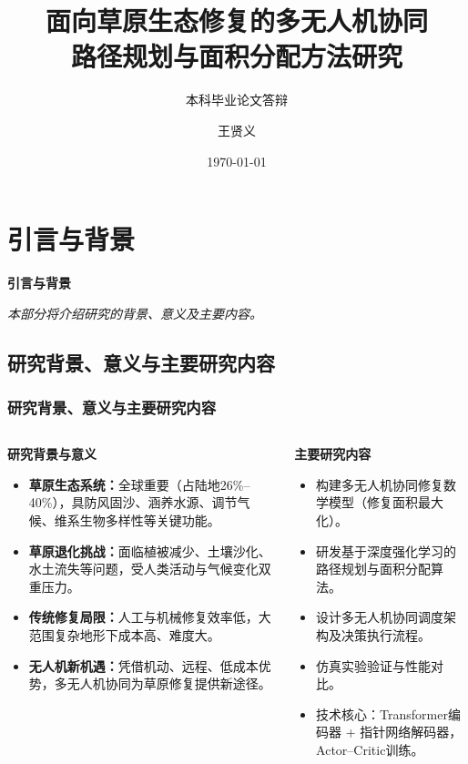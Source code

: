 \documentclass[10pt, aspectratio=169]{beamer}  %
\title{面向草原生态修复的多无人机协同\\路径规划与面积分配方法研究}
\subtitle{本科毕业论文答辩}
\author{王贤义}
\institute{兰州大学信息科学与工程学院}
\date{\today}
\begin{document}
\section{引言与背景}
\begin{frame}
	\centering %
	{\Huge \sffamily\bfseries\textcolor{njupt}{引言与背景}}
	\par %
	\vspace{0.5cm} %
	{\large \itshape{本部分将介绍研究的背景、意义及主要内容。}} %
\end{frame}

\subsection{研究背景、意义与主要研究内容}
\begin{frame}
    \frametitle{研究背景、意义与主要研究内容}
    \begin{columns}[T]
        \begin{column}{0.5\textwidth} %
            \footnotesize %
            \textbf{研究背景与意义}
            \begin{itemize}
                \item \textbf{草原生态系统：}全球重要（占陆地26\%--40\%），具防风固沙、涵养水源、调节气候、维系生物多样性等关键功能。
                \item \textbf{草原退化挑战：}面临植被减少、土壤沙化、水土流失等问题，受人类活动与气候变化双重压力。
                \item \textbf{传统修复局限：}人工与机械修复效率低，大范围复杂地形下成本高、难度大。
                \item \textbf{无人机新机遇：}凭借机动、远程、低成本优势，多无人机协同为草原修复提供新途径。
            \end{itemize}
        \end{column}
        \begin{column}{0.5\textwidth} %
            \footnotesize %
            \textbf{主要研究内容}
            \begin{itemize}
                \item 构建多无人机协同修复数学模型（修复面积最大化）。
                \item 研发基于深度强化学习的路径规划与面积分配算法。
                \item 设计多无人机协同调度架构及决策执行流程。
                \item 仿真实验验证与性能对比。
                \item 技术核心：Transformer编码器 + 指针网络解码器，Actor--Critic训练。
            \end{itemize}
        \end{column}
    \end{columns}
\end{frame}
\end{document}
